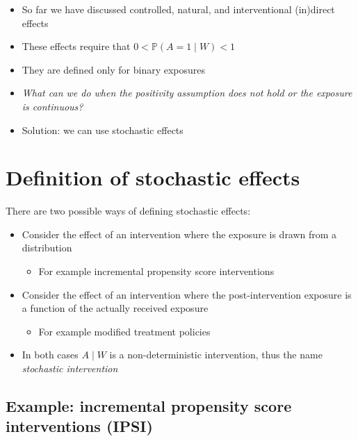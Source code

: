 \documentclass[
  12pt,
]{book}
\providecommand{\tightlist}{%
  \setlength{\itemsep}{0pt}\setlength{\parskip}{0pt}}
\theoremstyle{definition}
\theoremstyle{definition}
\theoremstyle{definition}
\renewcommand{\P}{\mathbb{P}}
\newcommand{\1}{\mathbbm{1}}
\begin{document}
\begin{itemize}
\tightlist
\item
  So far we have discussed controlled, natural, and interventional (in)direct effects
\item
  These effects require that \(0 < \P(A=1\mid W) < 1\)
\item
  They are defined only for binary exposures
\item
  \emph{What can we do when the positivity assumption does not hold or the exposure
  is continuous?}
\item
  Solution: we can use stochastic effects
\end{itemize}

\hypertarget{definition-of-stochastic-effects}{%
\section{Definition of stochastic effects}\label{definition-of-stochastic-effects}}

There are two possible ways of defining stochastic effects:

\begin{itemize}
\tightlist
\item
  Consider the effect of an intervention where the exposure is drawn from a
  distribution

  \begin{itemize}
  \tightlist
  \item
    For example incremental propensity score interventions
  \end{itemize}
\end{itemize}

\begin{itemize}
\tightlist
\item
  Consider the effect of an intervention where the post-intervention exposure is
  a function of the actually received exposure

  \begin{itemize}
  \tightlist
  \item
    For example modified treatment policies
  \end{itemize}
\item
  In both cases \(A \mid W\) is a non-deterministic intervention, thus the name
  \emph{stochastic intervention}
\end{itemize}

\hypertarget{example-incremental-propensity-score-interventions-ipsi-kennedy2018nonparametric}{%
\subsection*{\texorpdfstring{Example: incremental propensity score interventions (IPSI) \citep{kennedy2018nonparametric}}{Example: incremental propensity score interventions (IPSI) {[}@kennedy2018nonparametric{]}}}\label{example-incremental-propensity-score-interventions-ipsi-kennedy2018nonparametric}}
\end{document}
